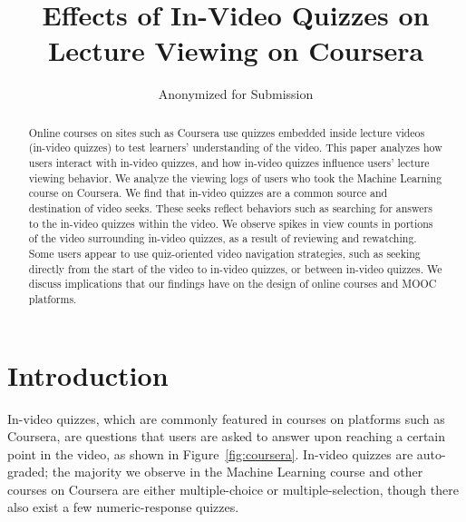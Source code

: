 \documentclass[letterpaper]{article}
\begin{document}
%

\title{Effects of In-Video Quizzes on Lecture Viewing on Coursera}
\author{Anonymized for Submission}

\maketitle

\begin{abstract}
Online courses on sites such as Coursera use quizzes embedded inside lecture videos (in-video quizzes) to test learners' understanding of the video. This paper analyzes how users interact with in-video quizzes, and how in-video quizzes influence users' lecture viewing behavior. We analyze the viewing logs of users who took the Machine Learning course on Coursera. We find that in-video quizzes are a common source and destination of video seeks. These seeks reflect behaviors such as searching for answers to the in-video quizzes within the video. We observe spikes in view counts in portions of the video surrounding in-video quizzes, as a result of reviewing and rewatching. Some users appear to use quiz-oriented video navigation strategies, such as seeking directly from the start of the video to in-video quizzes, or between in-video quizzes. We discuss implications that our findings have on the design of online courses and MOOC platforms. %
\end{abstract}

\section{Introduction}

In-video quizzes, which are commonly featured in courses on platforms such as Coursera, are questions that users are asked to answer upon reaching a certain point in the video, as shown in Figure~\ref{fig:coursera}. In-video quizzes are auto-graded; the majority we observe in the Machine Learning course and other courses on Coursera are either multiple-choice or multiple-selection, though there also exist a few numeric-response quizzes.
\end{document}
